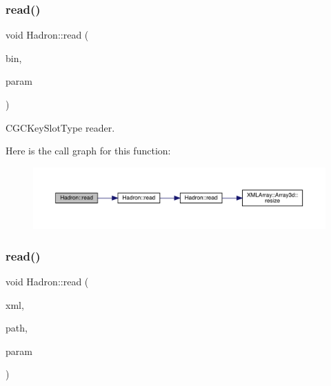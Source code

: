 \subsubsection{\texorpdfstring{read()}{read()}\hspace{0.1cm}{\footnotesize\ttfamily [3/94]}}
{\footnotesize\ttfamily void Hadron\+::read (\begin{DoxyParamCaption}\item[{\mbox{\hyperlink{classADATIO_1_1BinaryReader}{Binary\+Reader}} \&}]{bin,  }\item[{\mbox{\hyperlink{structHadron_1_1KeyCGCSU2__t}{Key\+C\+G\+C\+S\+U2\+\_\+t}} \&}]{param }\end{DoxyParamCaption})}



C\+G\+C\+Key\+Slot\+Type reader. 

Here is the call graph for this function\+:\nopagebreak
\begin{figure}[H]
\begin{center}
\leavevmode
\includegraphics[width=350pt]{d1/daf/namespaceHadron_a5f60c1536ae1aac0334573f8a80eb687_cgraph}
\end{center}
\end{figure}
\mbox{\label{namespaceHadron_a32f04cfa14604e9b40e037d78c0fad86}} 
\subsubsection{\texorpdfstring{read()}{read()}\hspace{0.1cm}{\footnotesize\ttfamily [4/94]}}
{\footnotesize\ttfamily void Hadron\+::read (\begin{DoxyParamCaption}\item[{\mbox{\hyperlink{classADATXML_1_1XMLReader}{X\+M\+L\+Reader}} \&}]{xml,  }\item[{const std\+::string \&}]{path,  }\item[{\mbox{\hyperlink{structHadron_1_1KeyCGCSU3__t}{Key\+C\+G\+C\+S\+U3\+\_\+t}} \&}]{param }\end{DoxyParamCaption})}



